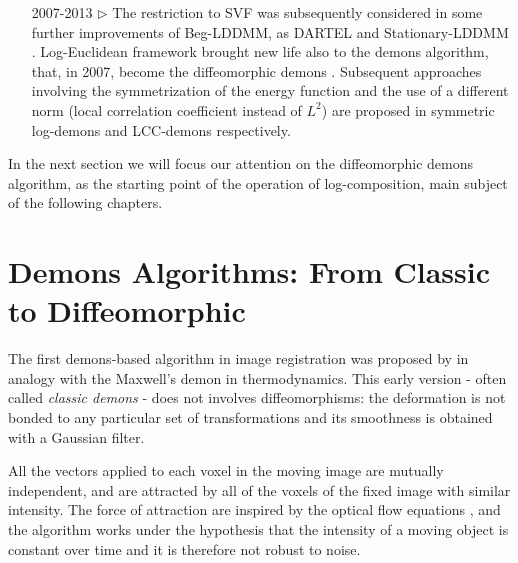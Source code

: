 \begin{enumerate}
	\item[2007-2013 $\triangleright$] The restriction to SVF was subsequently considered in some further improvements of Beg-LDDMM, as DARTEL \cite{Ashburner:07} and Stationary-LDDMM  \cite{hernandez2007registration}. 
	Log-Euclidean framework brought new life also to the demons algorithm, that, in 2007, become the diffeomorphic demons \cite{vercauteren2007non}.
	Subsequent approaches involving the symmetrization of the energy function and the use of a different norm (local correlation coefficient instead of $L^{2}$) are proposed in symmetric log-demons \cite{vercauteren08} and LCC-demons \cite{lorenzi2013lcc} respectively.
	
\end{enumerate}
\noindent
In the next section we will focus our attention on the diffeomorphic demons algorithm, as the starting point of the operation of log-composition, main subject of the following chapters.

\section{Demons Algorithms: From Classic to Diffeomorphic}

The first demons-based algorithm in image registration was proposed by \cite{thirion1998image} in analogy with the Maxwell's demon in thermodynamics. This early version - often called \emph{classic demons} - does not involves diffeomorphisms: the deformation is not bonded to any particular set of transformations and its smoothness is obtained with a Gaussian filter.

All the vectors applied to each voxel in the moving image are mutually independent, and are attracted by all of the voxels of the fixed image with similar intensity. The force of attraction are inspired by the optical flow equations \cite{horn1981determining}, and the algorithm works under the hypothesis that the intensity of a moving object is constant over time and it is therefore not robust to noise. 

